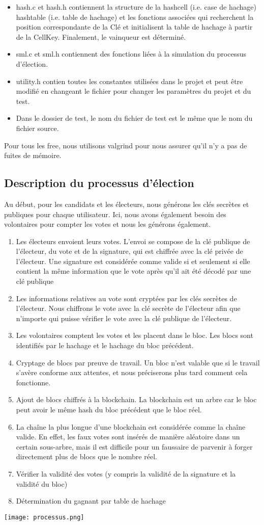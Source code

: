 \documentclass{article}
\begin{document}
\begin{itemize}
\item hash.c et hash.h contiennent la structure de la hashcell (i.e. case de hachage) hashtable (i.e. table de hachage) et les fonctions associées qui recherchent la position correspondante de la Clé et initialisent la table de hachage à partir de la CellKey. Finalement, le vainqueur est déterminé.
\item sml.c et sml.h contiennent des fonctions liées à la simulation du processus d'élection.
\item utility.h contien toutes les constantes utilisées dans le projet et peut être modifié en changeant le fichier pour changer les paramètres du projet et du test.
\item Dans le dossier de test, le nom du fichier de test est le même que le nom du fichier source.
\end{itemize}
Pour tous les free, nous utilisons valgrind pour nous assurer qu'il n'y a pas de fuites de mémoire.
\subsection{Description du processus d'élection}
Au début, pour les candidats et les électeurs, nous générons les clés secrètes et publiques pour chaque utilisateur. Ici, nous avons également besoin des volontaires pour compter les votes et nous les générons également.
\begin{enumerate}
\item Les électeurs envoient leurs votes. L'envoi se compose de la clé publique de l'électeur, du vote et de la signature, qui est chiffrée avec la clé privée de l'électeur. Une signature est considérée comme valide si et seulement si elle contient la même information que le vote après qu'il ait été décodé par une clé publique
\item Les informations relatives au vote sont cryptées par les clés secrètes  de l'électeur. Nous chiffrons le vote avec la clé secrète de l'électeur afin que n'importe qui puisse vérifier le vote avec la clé publique de l'électeur.
\item Les volontaires comptent les votes et les placent dans le bloc. Les blocs sont identifiés par le hachage et le hachage du bloc précédent.
\item Cryptage de blocs par preuve de travail. Un bloc n'est valable que si le travail s'avère conforme aux attentes, et nous préciserons plus tard comment cela fonctionne.
\item Ajout de blocs chiffrés à la blockchain. La blockchain est un arbre car le bloc peut avoir le même hash du bloc précédent que le bloc réel.
\item La chaîne la plus longue d'une blockchain est considérée comme la chaîne valide. En effet, les faux votes sont insérés de manière aléatoire dans un certain sous-arbre, mais il est difficile pour un faussaire de parvenir à forger directement plus de blocs que le nombre réel.
\item Vérifier la validité des votes (y compris la validité de la signature et la validité du bloc)
\item Détermination du gagnant par table de hachage
\end{enumerate}
\centerline{\texttt{[image: processus.png]}}
\end{document}
